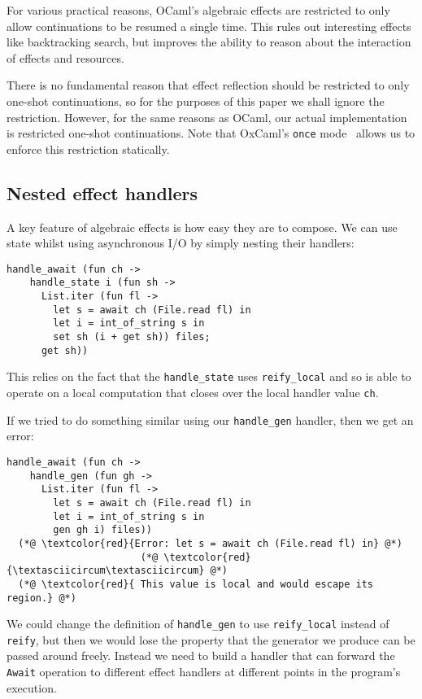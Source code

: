 \documentclass[acmsmall, screen, review, anonymous]{acmart}
\theoremstyle{definition}
\begin{document}
For various practical reasons, OCaml's algebraic effects are restricted
to only allow continuations to be resumed a single time. This rules out
interesting effects like backtracking search, but improves the ability
to reason about the interaction of effects and resources.

There is no fundamental reason that effect reflection should be
restricted to only one-shot continuations, so for the purposes of this
paper we shall ignore the restriction. However, for the same reasons as
OCaml, our actual implementation is restricted one-shot
continuations. Note that OxCaml's \lstinline[style=oxcaml]{once}
mode~\cite{lorenzen2024oxidizing} allows us to enforce this restriction
statically.

\subsection{Nested effect handlers}

A key feature of algebraic effects is how easy they are to compose. We
can use state whilst using asynchronous I/O by simply nesting their
handlers:
\begin{lstlisting}[style=oxcaml]
  handle_await (fun ch ->
    handle_state i (fun sh ->
      List.iter (fun fl ->
        let s = await ch (File.read fl) in
        let i = int_of_string s in
        set sh (i + get sh)) files;
      get sh))
\end{lstlisting}

This relies on the fact that the \lstinline[style=oxcaml]{handle_state}
uses \lstinline[style=oxcaml]{reify_local} and so is able to operate on a
local computation that closes over the local handler value
\lstinline[style=oxcaml]{ch}.

If we tried to do something similar using our
\lstinline[style=oxcaml]{handle_gen} handler, then we get an error:
\begin{lstlisting}[style=oxcaml]
  handle_await (fun ch ->
    handle_gen (fun gh ->
      List.iter (fun fl ->
        let s = await ch (File.read fl) in
        let i = int_of_string s in
        gen gh i) files))
  (*@ \textcolor{red}{Error: let s = await ch (File.read fl) in} @*)
                       (*@ \textcolor{red}{\textasciicircum\textasciicircum} @*)
  (*@ \textcolor{red}{ This value is local and would escape its region.} @*)
\end{lstlisting}

We could change the definition of \lstinline[style=oxcaml]{handle_gen} to
use \lstinline[style=oxcaml]{reify_local} instead of
\lstinline[style=oxcaml]{reify}, but then we would lose the property that
the generator we produce can be passed around freely. Instead we need to
build a handler that can forward the \lstinline[style=oxcaml]{Await}
operation to different effect handlers at different points in the
program's execution.
\end{document}
